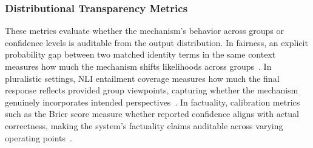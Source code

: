 \subsubsection{Distributional Transparency Metrics}
These metrics evaluate whether the mechanism's behavior across groups or confidence levels is auditable from the output distribution. In fairness, an explicit probability gap between two matched identity terms in the same context measures how much the mechanism shifts likelihoods across groups~\citep{cai2024locating}. In pluralistic settings, NLI entailment coverage measures how much the final response reflects provided group viewpoints, capturing whether the mechanism genuinely incorporates intended perspectives~\citep{qin2024mitigating}. In factuality, calibration metrics such as the Brier score measure whether reported confidence aligns with actual correctness, making the system's factuality claims auditable across varying operating points~\citep{10.5555/3692070.3693020, yang2024confidencecalibrationrationalizationllms}. 

